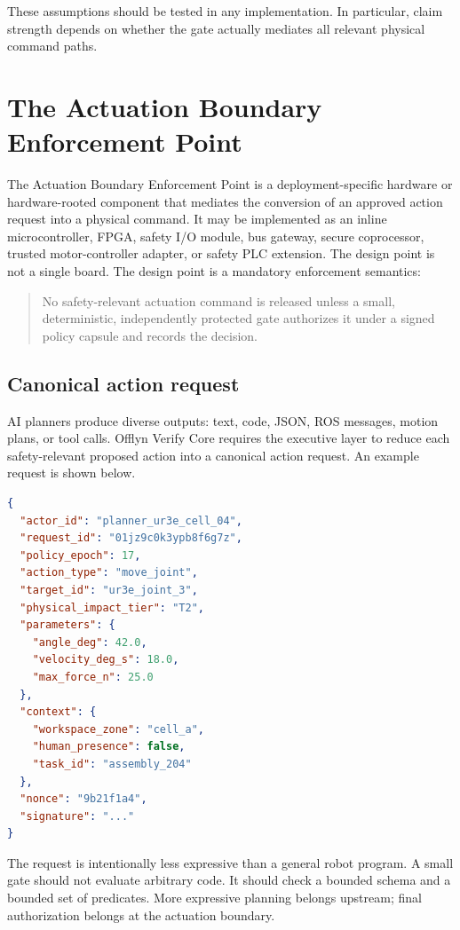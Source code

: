 \documentclass[10pt]{article}
\newcommand{\ovc}{Offlyn Verify Core\xspace}
\newcommand{\abep}{Actuation Boundary Enforcement Point\xspace}
\begin{document}
These assumptions should be tested in any implementation. In particular, claim strength depends on whether the gate actually mediates all relevant physical command paths.

\section{The Actuation Boundary Enforcement Point}

The \abep is a deployment-specific hardware or hardware-rooted component that mediates the conversion of an approved action request into a physical command. It may be implemented as an inline microcontroller, FPGA, safety I/O module, bus gateway, secure coprocessor, trusted motor-controller adapter, or safety PLC extension. The design point is not a single board. The design point is a mandatory enforcement semantics:

\begin{quote}
No safety-relevant actuation command is released unless a small, deterministic, independently protected gate authorizes it under a signed policy capsule and records the decision.
\end{quote}

\subsection{Canonical action request}

AI planners produce diverse outputs: text, code, JSON, ROS messages, motion plans, or tool calls. \ovc requires the executive layer to reduce each safety-relevant proposed action into a canonical action request. An example request is shown below.

\begin{lstlisting}[language=json,caption={Example canonical action request.}]
{
  "actor_id": "planner_ur3e_cell_04",
  "request_id": "01jz9c0k3ypb8f6g7z",
  "policy_epoch": 17,
  "action_type": "move_joint",
  "target_id": "ur3e_joint_3",
  "physical_impact_tier": "T2",
  "parameters": {
    "angle_deg": 42.0,
    "velocity_deg_s": 18.0,
    "max_force_n": 25.0
  },
  "context": {
    "workspace_zone": "cell_a",
    "human_presence": false,
    "task_id": "assembly_204"
  },
  "nonce": "9b21f1a4",
  "signature": "..."
}
\end{lstlisting}

The request is intentionally less expressive than a general robot program. A small gate should not evaluate arbitrary code. It should check a bounded schema and a bounded set of predicates. More expressive planning belongs upstream; final authorization belongs at the actuation boundary.
\end{document}
